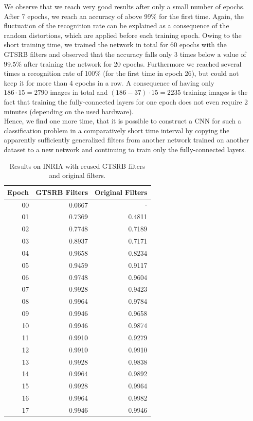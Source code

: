 \documentclass[11pt, a4paper]{article}
\begin{document}
We observe that we reach very good results after only a small number of epochs. After 7 epochs, we reach an accuracy of above 99\% for the first time. Again, the fluctuation of the recognition rate can be explained as a consequence of the random distortions, which are applied before each training epoch. Owing to the short training time, we trained the network in total for 60 epochs with the GTSRB filters and observed that the accuracy falls only 3 times below a value of 99.5\% after training the network for 20 epochs. Furthermore we reached several times a recognition rate of 100\% (for the first time in epoch 26), but could not keep it for more than 4 epochs in a row.
A consequence of having only $186 \cdot 15 = 2790$ images in total and $(186 - 37) \cdot 15 = 2235$ training images is the fact that training the fully-connected layers for one epoch does not even require 2 minutes (depending on the used hardware).\\
Hence, we find one more time, that it is possible to construct a CNN for such a classification problem in a comparatively short time interval by copying the apparently sufficiently generalized filters from another network trained on another dataset to a new network and continuing to train only the fully-connected layers.

\begin{table}[h!]
	\centering
	\begin{tabular}{|r|rr|}
		\hline
		Epoch & GTSRB Filters & Original Filters\\ \hline
		00 & 0.0667 & -\\
		01 & 0.7369 & 0.4811\\
		02 & 0.7748 & 0.7189\\
		03 & 0.8937 & 0.7171\\
		04 & 0.9658 & 0.8234\\
		05 & 0.9459 & 0.9117\\
		06 & 0.9748 & 0.9604\\
		07 & 0.9928 & 0.9423\\
		08 & 0.9964 & 0.9784\\
		09 & 0.9946 & 0.9658\\
		10 & 0.9946 & 0.9874\\
		11 & 0.9910 & 0.9279\\
		12 & 0.9910 & 0.9910\\
		13 & 0.9928 & 0.9838\\
		14 & 0.9964 & 0.9892\\
		15 & 0.9928 & 0.9964\\
		16 & 0.9964 & 0.9982\\
		17 & 0.9946 & 0.9946\\ \hline
	\end{tabular}

	\caption{Results on INRIA with reused GTSRB filters and original filters. }
	\label{tab:inria-results}
\end{table}
\end{document}
